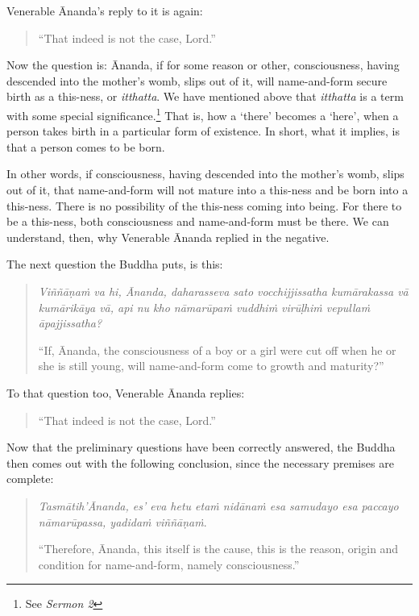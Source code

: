 Venerable Ānanda's reply to it is again:

\begin{quote}
``That indeed is not the case, Lord.''
\end{quote}

Now the question is: Ānanda, if for some reason or other, consciousness, having descended into the mother's womb, slips out of it, will name-and-form secure birth as a this-ness, or \emph{itthatta}. We have mentioned above that \emph{itthatta} is a term with some special significance.\footnote{See \emph{Sermon 2}} That is, how a `there' becomes a `here', when a person takes birth in a particular form of existence. In short, what it implies, is that a person comes to be born.

In other words, if consciousness, having descended into the mother's womb, slips out of it, that name-and-form will not mature into a this-ness and be born into a this-ness. There is no possibility of the this-ness coming into being. For there to be a this-ness, both consciousness and name-and-form must be there. We can understand, then, why Venerable Ānanda replied in the negative.

The next question the Buddha puts, is this:

\begin{quote}
\emph{Viññāṇaṁ va hi, Ānanda, daharasseva sato vocchijjissatha kumārakassa vā kumārikāya vā, api nu kho nāmarūpaṁ vuddhiṁ virūḷhiṁ vepullaṁ āpajjissatha?}

``If, Ānanda, the consciousness of a boy or a girl were cut off when he or she is still young, will name-and-form come to growth and maturity?''
\end{quote}

To that question too, Venerable Ānanda replies:

\begin{quote}
``That indeed is not the case, Lord.''
\end{quote}

Now that the preliminary questions have been correctly answered, the Buddha then comes out with the following conclusion, since the necessary premises are complete:

\begin{quote}
\emph{Tasmātih'Ānanda, es' eva hetu etaṁ nidānaṁ esa samudayo esa paccayo nāmarūpassa, yadidaṁ viññāṇaṁ}.

``Therefore, Ānanda, this itself is the cause, this is the reason, origin and condition for name-and-form, namely consciousness.''
\end{quote}

